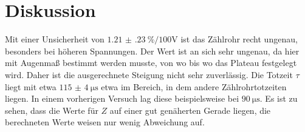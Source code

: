 \section{Diskussion}
\label{sec:Diskussion}


Mit einer Unsicherheit von $\SI{1.21(23)}{\%\per100\volt}$ ist das Zählrohr recht ungenau, besonders bei höheren Spannungen.
Der Wert ist an sich sehr ungenau, da hier mit Augenmaß bestimmt werden musste, von wo bis wo das Plateau festgelegt wird.
Daher ist die ausgerechnete Steigung nicht sehr zuverlässig.
Die Totzeit $\tau$ liegt mit etwa $\SI{115(4)}{\micro\second}$ etwa im Bereich, in dem andere Zählrohrtotzeiten liegen. In einem vorherigen Versuch lag diese beispielsweise bei $\SI{90}{\micro\second}$. \cite{V603}
Es ist zu sehen, dass die Werte für $Z$ auf einer gut genäherten Gerade liegen, die berechneten Werte weisen nur wenig Abweichung auf.